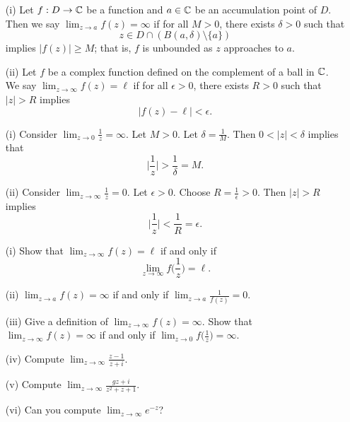 \documentclass[a4paper]{report}
\begin{document}
\begin{definition}
    \begin{enumerate}
        \item[(i)] Let \( f: D \to \mathbb{C}  \) be a function and \( a \in \mathbb{C}  \) be an accumulation point of \( D  \). Then we say \( \lim_{ z \to a } f(z) = \infty   \) if for all \( M > 0  \), there exists \( \delta > 0  \) such that
            \[  z \in D \cap (B(a,\delta) \setminus  \{ a \} ) \]
            implies \( | f(z) | \geq  M \); that is, \( f  \) is unbounded as \( z  \) approaches to \( a  \).
        \item[(ii)] Let \( f  \) be a complex function defined on the complement of a ball in \( \mathbb{C}  \). We say \( \lim_{ z \to \infty  } f(z) = \ell  \) if for all \( \epsilon > 0  \), there exists \( R > 0  \) such that \( | z  |  > R  \) implies 
            \[  | f(z) - \ell  | < \epsilon. \]
    \end{enumerate}
\end{definition}

\begin{eg}
    \begin{enumerate}
        \item[(i)] Consider \( \lim_{ z \to 0 }  \frac{ 1 }{ z }  = \infty   \). Let \( M > 0  \). Let \( \delta = \frac{ 1 }{ M }  \). Then \( 0 < | z  |  < \delta \) implies that 
            \[  \Big| \frac{ 1 }{ z }  \Big| > \frac{ 1 }{ \delta } = M. \]
        \item[(ii)] Consider \( \lim_{ z \to \infty  }   \frac{ 1 }{ z }  = 0.  \)
            Let \( \epsilon > 0  \). Choose \( R = \frac{ 1 }{ \epsilon } > 0  \). Then 
            \(  | z  |  > R  \) implies 
            \[  \Big| \frac{ 1 }{ z }  \Big| < \frac{ 1 }{ R } = \epsilon. \]
    \end{enumerate}
\end{eg}

\begin{problem}
    \begin{enumerate}
        \item[(i)] Show that \( \lim_{ z \to \infty  } f(z) = \ell  \) if and only if
            \[  \lim_{ z \to \infty  } f \Big(  \frac{ 1 }{ z }  \Big) = \ell.  \]
        \item[(ii)] \( \lim_{ z \to a } f(z) = \infty   \) if and only if \( \lim_{ z \to a }  \frac{ 1 }{ f(z) } = 0  \).
        \item[(iii)] Give a definition of \( \lim_{ z \to \infty  } f(z) = \infty   \). Show that \( \lim_{ z \to \infty  } f(z) = \infty  \) if and only if \( \lim_{ z \to 0 } f \Big(  \frac{ 1 }{ z }  \Big) = \infty  \).
        \item[(iv)] Compute \( \lim_{ z \to \infty  }  \frac{ z - 1  }{ z + i  }  \).
        \item[(v)] Compute \( \lim_{ z \to \infty    }  \frac{ gz + i  }{ z^{2} + z + 1  }  \). 
        \item[(vi)] Can you compute \( \lim_{ z \to \infty   }  e^{-z}  \)?
    \end{enumerate}
\end{problem}
\end{document}
